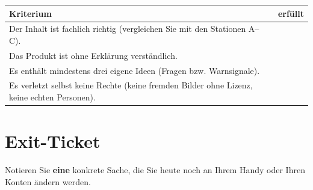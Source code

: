 \begin{center}
	\renewcommand{\arraystretch}{1.4}
	\begin{tabular}{p{12.5cm}c}
		\textbf{Kriterium}                                                                   & \textbf{erfüllt}   \\
		\midrule
		Der Inhalt ist fachlich richtig (vergleichen Sie mit den Stationen A--C).            & \faSquare[regular] \\
		Das Produkt ist ohne Erklärung verständlich.                                         & \faSquare[regular] \\
		Es enthält mindestens drei eigene Ideen (Fragen bzw. Warnsignale).                   & \faSquare[regular] \\
		Es verletzt selbst keine Rechte (keine fremden Bilder ohne Lizenz, keine echten Personen). & \faSquare[regular] \\
	\end{tabular}
\end{center}

\section{Exit-Ticket}

\begin{myexercise}
	Notieren Sie \textbf{eine} konkrete Sache, die Sie heute noch an Ihrem Handy oder Ihren Konten ändern werden.
	\schreibzeile
\end{myexercise}
